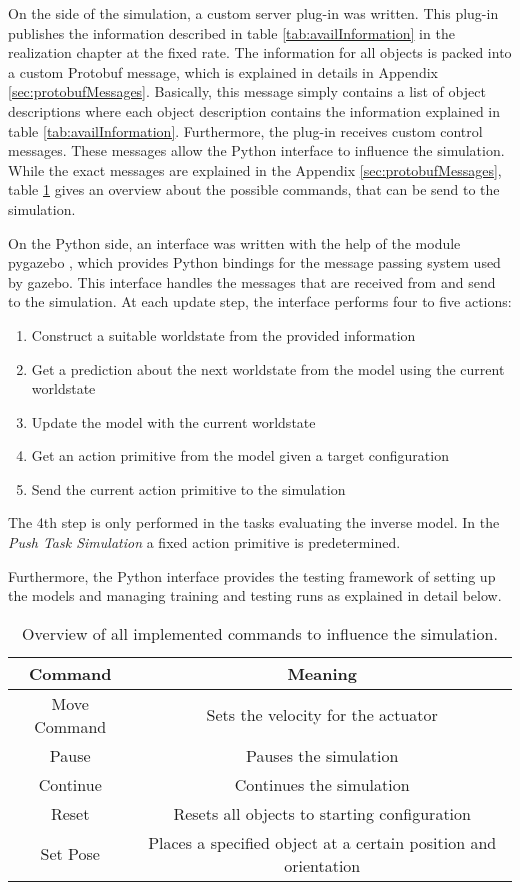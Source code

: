 On the side of the simulation, a custom server plug-in was written. This plug-in publishes the information described in table \ref{tab:availInformation} in the realization chapter at the fixed rate. 
The information for all objects is packed into a custom Protobuf message, which is explained in details in Appendix \ref{sec:protobufMessages}. Basically, this message simply contains a list of object descriptions where each object description contains the information explained in table \ref{tab:availInformation}.
Furthermore, the plug-in receives custom control messages. These messages allow the Python interface to influence the simulation.
While the exact messages are explained in the Appendix \ref{sec:protobufMessages}, table \ref{tab:commands} gives an overview about the possible commands, that can be send to the simulation.

On the Python side, an interface was written with the help of the module pygazebo \cite{pygazebo}, which provides Python bindings for the message passing system used by gazebo. This interface handles the messages that are received from and send to the simulation. 
At each update step, the interface performs four to five actions:
\begin{enumerate}
\item Construct a suitable worldstate from the provided information
\item Get a prediction about the next worldstate from the model using the current worldstate
\item Update the model with the current worldstate
\item Get an action primitive from the model given a target configuration
\item Send the current action primitive to the simulation
\end{enumerate}

The 4th step is only performed in the tasks evaluating the inverse model. In the \textit{Push Task Simulation} a fixed action primitive is predetermined.

Furthermore, the Python interface provides the testing framework of setting up the models and managing training and testing runs as explained in detail below.

\begin{table}
	\centering
	\begin{tabular}{|c|c|}
		\hline \textbf{Command} & \textbf{Meaning} \\ 
		\hline Move Command & Sets the velocity for the actuator \\ 
		\hline Pause & Pauses the simulation \\
		\hline Continue & Continues the simulation \\
		\hline Reset & Resets all objects to starting configuration \\
		\hline Set Pose & Places a specified object at a certain position and orientation \\
		\hline
	\end{tabular} 
	\caption{Overview of all implemented commands to influence the simulation.}
	\label{tab:commands}
\end{table}


